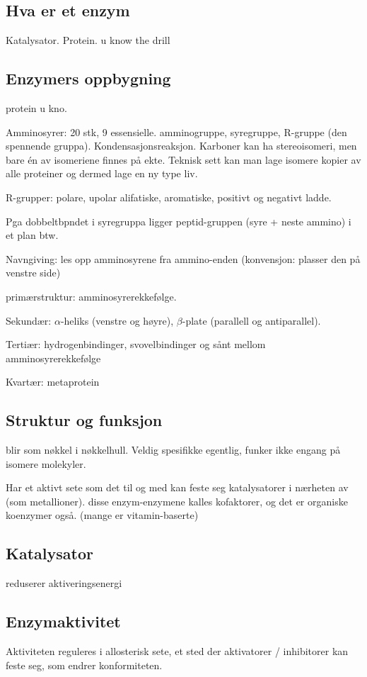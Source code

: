 \subsection{Hva er et enzym}
    Katalysator. Protein. u know the drill

\subsection{Enzymers oppbygning}
    protein u kno. 

    Amminosyrer: 
    20 stk, 9 essensielle. amminogruppe, syregruppe, R-gruppe (den spennende gruppa). Kondensasjonsreaksjon.
    Karboner kan ha stereoisomeri, men bare én av isomeriene finnes på ekte. 
    Teknisk sett kan man lage isomere kopier av alle proteiner og dermed lage en ny type liv. 

    R-grupper: 
    polare, upolar alifatiske, aromatiske, positivt og negativt ladde. 
    
    Pga dobbeltbpndet i syregruppa ligger peptid-gruppen (syre + neste ammino) i et plan btw.

    Navngiving: les opp amminosyrene fra ammino-enden (konvensjon: plasser den på venstre side)

    primærstruktur: amminosyrerekkefølge. 

    Sekundær: $\alpha$-heliks (venstre og høyre), $\beta$-plate (parallell og antiparallel).

    Tertiær: hydrogenbindinger, svovelbindinger og sånt mellom amminosyrerekkefølge

    Kvartær: metaprotein

\subsection{Struktur og funksjon}
    blir som nøkkel i nøkkelhull. Veldig spesifikke egentlig, funker ikke engang på isomere molekyler. 

    Har et aktivt sete som det til og med kan feste seg katalysatorer i nærheten av (som metallioner).
    disse enzym-enzymene kalles kofaktorer, og det er organiske koenzymer også. (mange er vitamin-baserte)

\subsection{Katalysator}
    reduserer aktiveringsenergi

\subsection{Enzymaktivitet}
    Aktiviteten reguleres i allosterisk sete, et sted der aktivatorer / inhibitorer kan feste seg, som endrer konformiteten.

